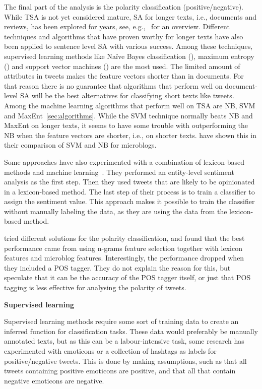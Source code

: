 The final part of the analysis is the polarity classification (positive/negative). While TSA is not yet considered mature, SA for longer texts, i.e., documents and reviews, has been explored for years, see, e.g.,~\cite{book:pang} for an overview. Different techniques and algorithms that have proven worthy for longer texts have also been applied to sentence level SA with various success. Among these techniques, supervised learning methods like Na\"{i}ve Bayes classification (), maximum entropy () and support vector machines () are the most used. The limited amount of attributes in tweets makes the feature vectors shorter than in documents. For that reason there is no guarantee that algorithms that perform well on document-level SA will be the best alternatives for classifying short texts like tweets. Among the machine learning algorithms that perform well on TSA are NB, SVM and MaxEnt~\ref{sec:algorithms}. While the SVM technique normally beats NB and MaxEnt on longer texts, it seems to have some trouble with outperforming the NB when the feature vectors are shorter, i.e., on shorter texts. \cite{article:bermingham} have shown this in their comparison of SVM and NB for microblogs.

Some approaches have also experimented with a combination of lexicon-based methods and  machine learning~\citep{article:mudinas}. They performed an entity-level sentiment analysis as the first step. Then they used tweets that are likely to be opinionated in a lexicon-based method. The last step of their process is to train a classifier to assign the sentiment value. This approach makes it possible to train the classifier without manually labeling the data, as they are using the data from the lexicon-based method.

\cite{article:omg} tried different solutions for the polarity classification, and found that the best performance came from using n-grams feature selection together with lexicon features and microblog features. Interestingly, the performance dropped when they included a POS tagger. They do not explain the reason for this, but speculate that it can be the accuracy of the POS tagger itself, or just that POS tagging is less effective for analysing the polarity of tweets.

\noindent
\textbf{Supervised learning} \\
\noindent

Supervised learning methods require some sort of training data to create an inferred function for classification tasks. These data would preferably be manually annotated texts, but as this can be a labour-intensive task, some research has experimented with emoticons or a collection of hashtags as labels for positive/negative tweets. This is done by making assumptions, such as that all tweets containing positive emoticons are positive, and that all that contain negative emoticons are negative.

